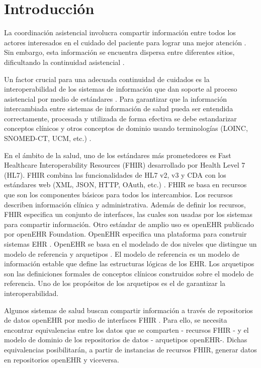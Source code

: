 \section{Introducción}

La coordinación asistencial involucra compartir información entre todos los actores interesados en el cuidado del paciente para lograr una mejor atención \cite{CareCoordination}. Sin embargo, esta información se encuentra dispersa entre diferentes sitios, dificultando la continuidad asistencial \cite{Indarte11}.

Un factor crucial para una adecuada continuidad de cuidados es la interoperabilidad de los sistemas de información que dan soporte al proceso asistencial por medio de estándares \cite{OPS16}. Para garantizar que la información intercambiada entre sistemas de información de salud pueda ser entendida correctamente, procesada y utilizada de forma efectiva se debe estandarizar conceptos clínicos y otros conceptos de dominio usando terminologías (LOINC, SNOMED-CT, UCM, etc.) \cite{ISO20514}.

En el ámbito de la salud, uno de los estándares más prometedores es Fast Healthcare Interoperability Resources (FHIR) desarrollado por Health Level 7 (HL7). FHIR combina las funcionalidades de HL7 v2, v3 y CDA con los estándares web (XML, JSON, HTTP, OAuth, etc.) \cite{FHIR}. FHIR se basa en recursos que son los componentes básicos para todos los intercambios. Los recursos describen información clínica y administrativa. Además de definir los recursos, FHIR especifica un conjunto de interfaces, las cuales son usadas por los sistemas para compartir información. Otro estándar de amplio uso es openEHR publicado por openEHR Foundation. OpenEHR especifica una plataforma para construir sistemas EHR \cite{openEHR}. OpenEHR se basa en el modelado de dos niveles que distingue un modelo de referencia y arquetipos \cite{Bale00}. El modelo de referencia es un modelo de información estable que define las estructuras lógicas de los EHR. Los arquetipos son las definiciones formales de conceptos clínicos construidos sobre el modelo de referencia. Uno de los propósitos de los arquetipos es el de garantizar la interoperabilidad.

Algunos sistemas de salud buscan compartir información a través de repositorios de datos openEHR por medio de interfaces FHIR \cite{Lopez16}. Para ello, se necesita encontrar equivalencias entre los datos que se comparten - recursos FHIR - y el modelo de dominio de los repositorios de datos - arquetipos openEHR-. Dichas equivalencias posibilitarán, a partir de instancias de recursos FHIR, generar datos en repositorios openEHR y viceversa.

